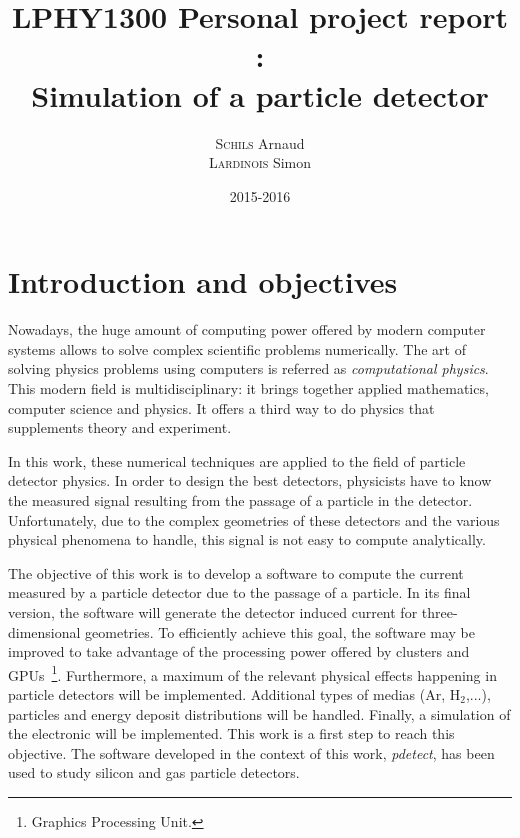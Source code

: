 \documentclass[11pt]{article}
\title{LPHY1300 Personal project report :\\ Simulation of a particle detector}
\author{\textsc{Schils} Arnaud\\ \textsc{Lardinois} Simon}
\date{2015-2016}
\begin{document}
\maketitle

\newpage


\renewcommand\cftsecleader{\cftdotfill{\cftdotsep}}
\renewcommand{\contentsname}{Table of contents}
\tableofcontents


\newpage
\section*{Introduction and objectives}

	Nowadays, the huge amount of computing power offered by modern computer systems allows
	to solve complex scientific problems numerically. The art of solving physics problems using
	computers is referred as \textit{computational physics}. This modern field
	is multidisciplinary: it brings together applied mathematics,
	computer science and physics. It offers a third way to do physics
	that supplements theory and experiment.

	In this work, these numerical techniques are applied to the field of particle
	detector physics. In order to design the best detectors,
	physicists have to know the measured signal resulting from the passage of a particle
	in the detector. Unfortunately, due to the complex geometries of these detectors
	and the various physical phenomena to handle, this signal is not easy
	to compute analytically.

	The objective of this work is to develop a software to compute the current measured
	by a particle detector due to the passage of a particle. In its final version,
	the software will generate the detector induced current for three-dimensional
	geometries. To efficiently achieve this goal, the software may be improved
	to take advantage of the processing power offered by clusters and GPUs~\footnote{Graphics Processing Unit.}.
	Furthermore, a maximum of the relevant physical effects happening
	in particle detectors will be implemented.
	Additional types of medias (Ar, H$_2$,...), particles and energy deposit
	distributions will be handled. Finally, a simulation of the electronic will
	be implemented. This work is a first step to reach this objective.
	The software developed in the context of this work, \textit{pdetect},
	has been used to study silicon and gas particle detectors.
\end{document}
